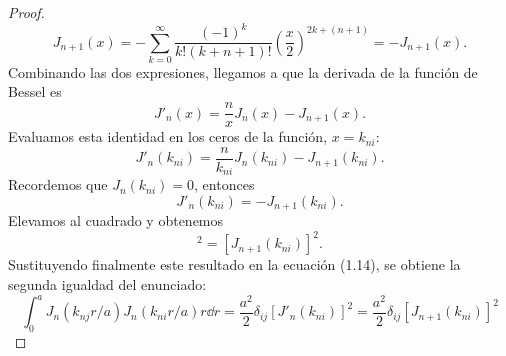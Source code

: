 \documentclass[11pt]{article}
\theoremstyle{definition}
\numberwithin{equation}{section}
\begin{document}
\begin{proof}
	\begin{equation}
		J_{n+1}(x) = -\sum_{k=0}^{\infty} \frac{(-1)^k}{k!(k+n+1)!} \left(\frac{x}{2}\right)^{2k+(n+1)} = -J_{n+1}(x).
	\end{equation}
	Combinando las dos expresiones, llegamos a que la derivada de la función de Bessel es
	\begin{equation}
		J'_n(x) = \frac{n}{x} J_n(x) - J_{n+1}(x).
	\end{equation}
	Evaluamos esta identidad en los ceros de la función, $x = k_{ni}$:
	\begin{equation}
		J'_n(k_{ni}) = \frac{n}{k_{ni}} J_n(k_{ni}) - J_{n+1}(k_{ni}).
	\end{equation}
	Recordemos que $J_n(k_{ni}) = 0$, entonces
	\begin{equation}
		J'_n(k_{ni}) = -J_{n+1}(k_{ni}).
	\end{equation}
	Elevamos al cuadrado y obtenemos
	\begin{equation}
		[J'_n(k_{ni})]^2 = [J_{n+1}(k_{ni})]^2.
	\end{equation}
	Sustituyendo finalmente este resultado en la ecuación (1.14), se obtiene la segunda igualdad del enunciado:
	\begin{equation}
		\boxed{\int_0^a J_n(k_{nj}r/a)J_n(k_{ni}r/a)r\dd{r}= \frac{a^2}{2}\delta_{ij} [J'_n(k_{ni})]^2 = \frac{a^2}{2}\delta_{ij}[J_{n+1}(k_{ni})]^2}
	\end{equation}
\end{proof}
\end{document}
